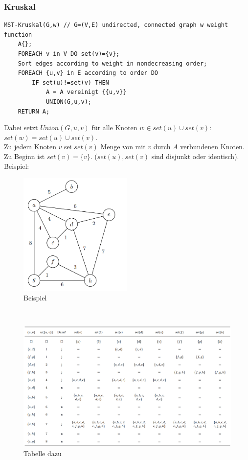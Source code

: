\documentclass{article}
\begin{document}
            \subsubsection{Kruskal}
                \begin{lstlisting}[style=pseudocode]
MST-Kruskal(G,w) // G=(V,E) undirected, connected graph w weight function
    A{};
    FOREACH v in V DO set(v)={v};
    Sort edges according to weight in nondecreasing order;
    FOREACH {u,v} in E according to order DO
        IF set(u)!=set(v) THEN
            A = A vereinigt {{u,v}}
            UNION(G,u,v);
    RETURN A;
                \end{lstlisting}
                Dabei setzt $Union(G,u,v)$ für alle Knoten $w\in set(u)\cup set(v)$: $set(w)=set(u)\cup set(v)$.\\
                Zu jedem Knoten $v$ sei $set(v)$ Menge von mit $v$ durch $A$ verbundenen Knoten. Zu Beginn ist $set(v)=\{v\}$. ($set(u),set(v)$ sind disjunkt oder identisch).\\
                Beispiel:\\
                \begin{figure}[ht]
                    \centering
                    \includegraphics[width=0.5\textwidth]{Bilder/KruskalBsp.png}
                    \caption{Beispiel}
                    \label{fig:KruskalBsp}
                \end{figure}\\
                \begin{figure}[ht]
                    \centering
                    \includegraphics[width=1\textwidth]{Bilder/KruskalBspTab.png}
                    \caption{Tabelle dazu}
                    \label{fig:KruskalBspTab}
                \end{figure}\\
\end{document}

